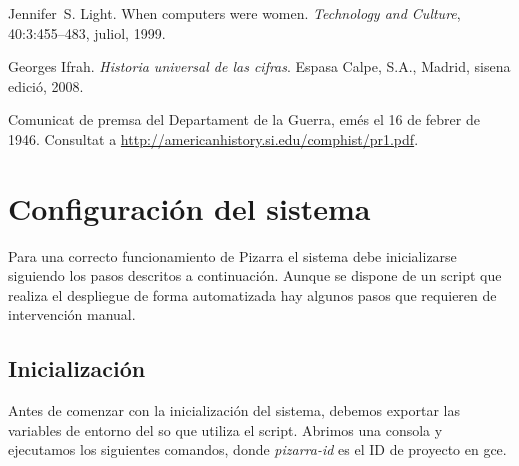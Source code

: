 \documentclass[11pt,spanish,listoffigures,listoftables]{tfgetsinf}
\begin{document}
\begin{thebibliography}{10}

   Jennifer~S. Light.
   \newblock When computers were women.
   \newblock \textit{Technology and Culture}, 40:3:455--483, juliol, 1999.

   Georges Ifrah.
   \newblock \textit{Historia universal de las cifras}.
   \newblock Espasa Calpe, S.A., Madrid, sisena edició, 2008.

   Comunicat de premsa del Departament de la Guerra, 
   emés el 16 de febrer de 1946. 
   \newblock Consultat a 
   \url{http://americanhistory.si.edu/comphist/pr1.pdf}.

\end{thebibliography}
\cleardoublepage

\APPENDIX

\chapter{Configuración del sistema}

Para una correcto funcionamiento de Pizarra el sistema debe inicializarse siguiendo los pasos descritos a continuación. Aunque se dispone de un script que realiza el despliegue de forma automatizada hay algunos pasos que requieren de intervención manual.

\section{Inicialización}

Antes de comenzar con la inicialización del sistema, debemos exportar las variables de entorno del \acrshort{so} que utiliza el script. Abrimos una consola y ejecutamos los siguientes comandos, donde \textit{pizarra-id} es el ID de proyecto en \acrfull{gce}.
\end{document}
